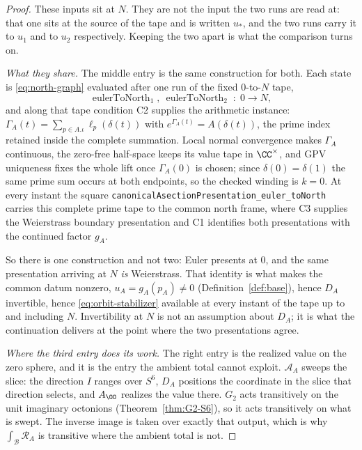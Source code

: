 \begin{proof}
These inputs sit at $N$. They are not the input the two runs are read at: that
one sits at the source of the tape and is written $u_\ast$, and the two runs
carry it to $u_1$ and to $u_2$ respectively. Keeping the two apart is what the
comparison turns on.

\medskip
\noindent\emph{What they share.}
The middle entry is the same construction for both. Each state is
\eqref{eq:north-graph} evaluated after one run of the fixed $0$-to-$N$ tape,
\[
  \operatorname{eulerToNorth}_1,\ \operatorname{eulerToNorth}_2
    \;:\;0\longrightarrow N,
\]
and along that tape condition \textup{C2} supplies the arithmetic instance:
$\Gamma_A(t)=\sum_{p\in A.\iota}\ell_p(\delta(t))$ with
$e^{\Gamma_A(t)}=A(\delta(t))$, the prime index retained inside the complete
summation. Local normal convergence makes $\Gamma_A$ continuous, the zero-free
half-space keeps its value tape in $\CC^\times$, and GPV uniqueness fixes the
whole lift once $\Gamma_A(0)$ is chosen; since $\delta(0)=\delta(1)$ the same
prime sum occurs at both endpoints, so the checked winding is $k=0$. At every
instant the square \texttt{canonicalAsectionPresentation\_euler\_toNorth}
carries this complete prime tape to the common north frame, where \textup{C3}
supplies the Weierstrass boundary presentation and \textup{C1} identifies both
presentations with the continued factor $g_A$.

So there is one construction and not two: Euler presents at $0$, and the same
presentation arriving at $N$ \emph{is} Weierstrass. That identity is what makes
the common datum nonzero, $u_A=g_A(p_A)\neq0$
\textup{(}Definition~\ref{def:base}\textup{)}, hence $D_A$ invertible, hence
\eqref{eq:orbit-stabilizer} available at every instant of the tape up to and
including $N$. Invertibility at $N$ is not an assumption about $D_A$; it is what
the continuation delivers at the point where the two presentations agree.

\medskip
\noindent\emph{Where the third entry does its work.}
The right entry is the realized value on the zero sphere, and it is the entry
the ambient total cannot exploit. $\mathcal A_A$ sweeps the slice: the direction
$I$ ranges over $S^6$, $D_A$ positions the coordinate in the slice that
direction selects, and $A_{\OO}$ realizes the value there. $G_2$ acts
transitively on the unit imaginary octonions
\textup{(}Theorem~\ref{thm:G2-S6}\textup{)}, so it acts transitively on what is
swept. The inverse image is taken over exactly that output, which is why
$\int_{\mathcal B}\mathcal R_A$ is transitive where the ambient total is not.
\end{proof}
